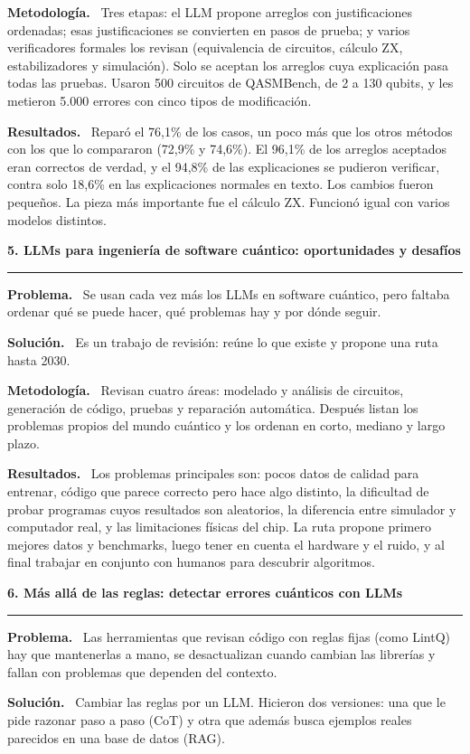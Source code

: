 \documentclass[11pt,a4paper]{article}
\newcommand{\paper}[1]{\vspace{1.2em}\par{\large\textbf{#1}}\par\vspace{0.2em}\hrule\vspace{0.4em}}
\newcommand{\parte}[1]{\par\textbf{#1.}\ }
\begin{document}
\parte{Metodología}
Tres etapas: el LLM propone arreglos con justificaciones ordenadas; esas justificaciones se convierten en pasos de prueba; y varios verificadores formales los revisan (equivalencia de circuitos, cálculo ZX, estabilizadores y simulación). Solo se aceptan los arreglos cuya explicación pasa todas las pruebas. Usaron 500 circuitos de QASMBench, de 2 a 130 qubits, y les metieron 5.000 errores con cinco tipos de modificación.

\parte{Resultados}
Reparó el 76,1\% de los casos, un poco más que los otros métodos con los que lo compararon (72,9\% y 74,6\%). El 96,1\% de los arreglos aceptados eran correctos de verdad, y el 94,8\% de las explicaciones se pudieron verificar, contra solo 18,6\% en las explicaciones normales en texto. Los cambios fueron pequeños. La pieza más importante fue el cálculo ZX. Funcionó igual con varios modelos distintos.

\paper{5. LLMs para ingeniería de software cuántico: oportunidades y desafíos}

\parte{Problema}
Se usan cada vez más los LLMs en software cuántico, pero faltaba ordenar qué se puede hacer, qué problemas hay y por dónde seguir.

\parte{Solución}
Es un trabajo de revisión: reúne lo que existe y propone una ruta hasta 2030.

\parte{Metodología}
Revisan cuatro áreas: modelado y análisis de circuitos, generación de código, pruebas y reparación automática. Después listan los problemas propios del mundo cuántico y los ordenan en corto, mediano y largo plazo.

\parte{Resultados}
Los problemas principales son: pocos datos de calidad para entrenar, código que parece correcto pero hace algo distinto, la dificultad de probar programas cuyos resultados son aleatorios, la diferencia entre simulador y computador real, y las limitaciones físicas del chip. La ruta propone primero mejores datos y benchmarks, luego tener en cuenta el hardware y el ruido, y al final trabajar en conjunto con humanos para descubrir algoritmos.

\paper{6. Más allá de las reglas: detectar errores cuánticos con LLMs}

\parte{Problema}
Las herramientas que revisan código con reglas fijas (como LintQ) hay que mantenerlas a mano, se desactualizan cuando cambian las librerías y fallan con problemas que dependen del contexto.

\parte{Solución}
Cambiar las reglas por un LLM. Hicieron dos versiones: una que le pide razonar paso a paso (CoT) y otra que además busca ejemplos reales parecidos en una base de datos (RAG).
\end{document}
